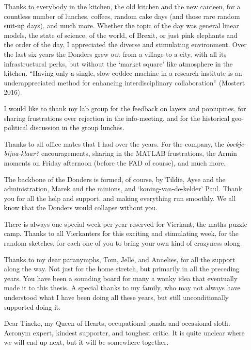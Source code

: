 Thanks to everybody in the kitchen, the old kitchen and the new canteen, for a countless number of lunches, coffees, random cake days (and those rare random suit-up days), and much more. Whether the topic of the day was general linear models, the state of science, of the world, of Brexit, or just pink elephants and the order of the day, I appreciated the diverse and stimulating environment. Over the last six years the Donders grew out from a village to a city, with all its infrastructural perks, but without the `market square' like atmosphere in the kitchen. ``Having only a single, slow coddee machine in a research institute is an underappreciated method for enhancing interdisciplinary collaboration'' (Mostert 2016).

I would like to thank my lab group for the feedback on layers and porcupines, for sharing frustrations over rejection in the info-meeting, and for the historical geo-political discussion in the group lunches.

Thanks to all office mates that I had over the years. For the company, the \emph{boekje-bijna-klaar?} encouragements, sharing in the MATLAB frustrations, the Armin moments on Friday afternoon (before the FAD of course), and much more. 
 
The backbone of the Donders is formed, of course, by Tildie, Ayse and the administration, Marek and the minions, and `koning-van-de-kelder' Paul. Thank you for all the help and support, and making everything run smoothly. We all know that the Donders would collapse without you. 

There is always one special week per year reserved for Vierkant, the maths puzzle camp. Thanks to all Vierkanters for this exciting and stimulating week, for the random sketches, for each one of you to bring your own kind of crazyness along. 

Thanks to my dear paranymphs, Tom, Jelle, and Annelies, for all the support along the way. Not just for the home stretch, but primarily in all the preceding years. You have been a sounding board for many a wonky idea that eventually made it to this thesis. A special thanks to my family, who may not always have understood what I have been doing all these years, but still unconditionally supported doing it.

Dear Tineke, my Queen of Hearts, occupational panda and occasional sloth. Acronym expert, kindest supporter, and toughest critic. It is quite unclear where we will end up next, but it will be somewhere together. 





